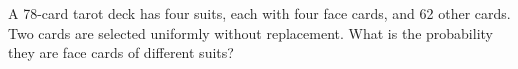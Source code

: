 A 78-card tarot deck has four suits, each with four face cards, and 62 other cards. Two cards are selected uniformly without replacement. What is the probability they are face cards of different suits?
